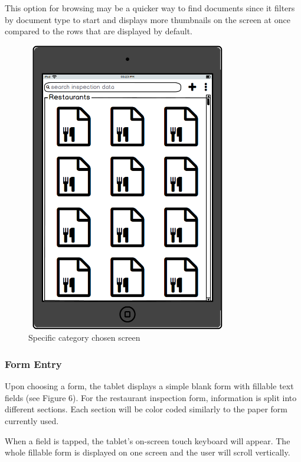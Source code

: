 \documentclass[twoside,letterpaper]{article}
\begin{document}
{\noindent This option for browsing may be a quicker way to find documents since it filters by document type to start and displays more thumbnails on the screen at once compared to the rows that are displayed by default.
\newline

\begin{figure}[H]
\centering
\includegraphics[width=3.5in,height=5in]{Specific_Category_Restaurants.png}
\caption{Specific category chosen screen}
\end{figure}
\newpage

\subsubsection[Form Entry]{\rmfamily\bfseries\color{black}
Form Entry}
Upon choosing a form, the tablet displays a simple blank form with fillable text fields (see Figure 6). For the restaurant inspection form, information is split into different sections. Each section will be color coded similarly to the paper form currently used.
\newline

\noindent When a field is tapped, the tablet's on-screen touch keyboard will appear. The whole fillable form is displayed on one screen and the user will scroll vertically.
\newline

}
\end{document}
